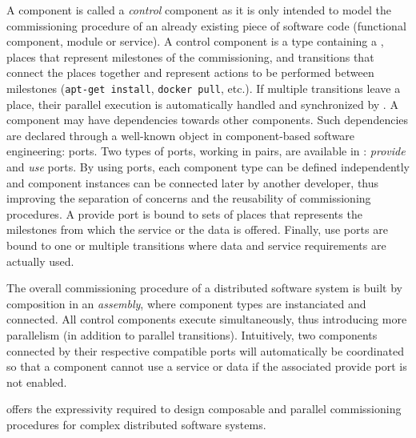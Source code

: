A \mad component is called a \emph{control} component as it is only
intended to model the commissioning procedure of an already existing
piece of software code (functional component, module or service). A
\mad control component is a type containing a \net, \ie places that
represent milestones of the commissioning, and transitions that
connect the places together and represent actions to be performed
between milestones (\eg \texttt{apt-get install}, \texttt{docker
  pull}, etc.). If multiple transitions leave a place, their parallel
execution is automatically handled and synchronized by \mad. A
component may have dependencies towards other components. Such
dependencies are declared through a well-known object in
component-based software engineering: ports. Two types of ports,
working in pairs, are available in \mad: \emph{provide} and \emph{use}
ports. By using ports, each component type can be defined
independently and component instances can be connected later by
another developer, thus improving the separation of concerns and the
reusability of commissioning procedures. A provide port is bound to
sets of places that represents the milestones from which the service
or the data is offered. Finally, use ports are bound to one or
multiple transitions where data and service requirements are actually
used.

The overall commissioning procedure of a distributed software system
is built by composition in an \emph{assembly}, where component
types are instanciated and connected. All control components execute
simultaneously, thus introducing more parallelism (in addition to
parallel transitions). Intuitively, two components connected by their
respective compatible ports will automatically be coordinated so
that a component cannot use a service or data if the associated
provide port is not enabled.

\mad offers the expressivity required to design composable and parallel
commissioning procedures for complex distributed software systems.

